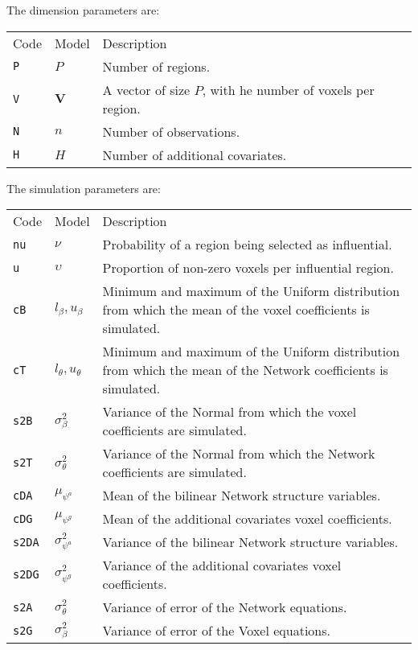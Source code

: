 \documentclass[
]{article}
\begin{document}
The dimension parameters are:

\begin{longtable}[]{@{}
  >{\raggedleft\arraybackslash}p{}
  >{\centering\arraybackslash}p{}
  >{\raggedright\arraybackslash}p{}@{}}
\toprule\noalign{}
\endhead
\bottomrule\noalign{}
\endlastfoot
Code & Model & Description \\
\texttt{P} & \(P\) & Number of regions. \\
\texttt{V} & \( {\boldsymbol V} \) & A vector of size \(P\), with he number of voxels per region. \\
\texttt{N} & \(n\) & Number of observations. \\
\texttt{H} & \(H\) & Number of additional covariates. \\
\end{longtable}

The simulation parameters are:

\begin{longtable}[]{@{}
  >{\raggedleft\arraybackslash}p{}
  >{\centering\arraybackslash}p{}
  >{\raggedright\arraybackslash}p{}@{}}
\toprule\noalign{}
\endhead
\bottomrule\noalign{}
\endlastfoot
Code & Model & Description \\
\texttt{nu} & \(\nu\) & Probability of a region being selected as influential. \\
\texttt{u} & \(\upsilon\) & Proportion of non-zero voxels per influential region. \\
\texttt{cB} & \(l_\beta,u_\beta\) & Minimum and maximum of the Uniform distribution from which the mean of the voxel
coefficients is simulated. \\
\texttt{cT} & \(l_\theta,u_\theta\) & Minimum and maximum of the Uniform distribution from which the mean of the Network
coefficients is simulated. \\
\texttt{s2B} & \(\sigma^2_{\beta}\) & Variance of the Normal from which the voxel coefficients are simulated. \\
\texttt{s2T} & \(\sigma^2_{\theta}\) & Variance of the Normal from which the Network coefficients are simulated. \\
\texttt{cDA} & \(\mu_{\psi^a}\) & Mean of the bilinear Network structure variables. \\
\texttt{cDG} & \(\mu_{\psi^g}\) & Mean of the additional covariates voxel coefficients. \\
\texttt{s2DA} & \(\sigma^2_{\psi^a}\) & Variance of the bilinear Network structure variables. \\
\texttt{s2DG} & \(\sigma^2_{\psi^g}\) & Variance of the additional covariates voxel coefficients. \\
\texttt{s2A} & \(\sigma^2_{\theta}\) & Variance of error of the Network equations. \\
\texttt{s2G} & \(\sigma^2_{\beta}\) & Variance of error of the Voxel equations. \\
\end{longtable}
\end{document}
